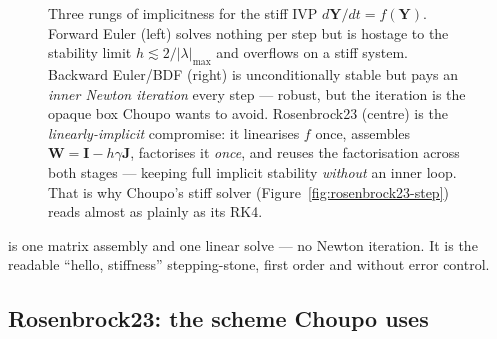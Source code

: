\documentclass[11pt,a4paper]{article}
\newcommand{\Jac}{\mathbf{J}}
\newcommand{\Yv}{\mathbf{Y}}                          %
\begin{document}
\begin{figure}[ht]
\caption{Three rungs of implicitness for the stiff IVP
$d\Yv/dt=f(\Yv)$.  Forward Euler (left) solves nothing per step but is
hostage to the stability limit $h\lesssim2/|\lambda|_{\max}$ and
overflows on a stiff system.  Backward Euler/BDF (right) is
unconditionally stable but pays an \emph{inner Newton iteration} every
step --- robust, but the iteration is the opaque box Choupo wants to
avoid.  Rosenbrock23 (centre) is the \emph{linearly-implicit}
compromise: it linearises $f$ once, assembles
$\mathbf W=\mathbf I-h\gamma\Jac$, factorises it \emph{once}, and reuses
the factorisation across both stages --- keeping full implicit stability
\emph{without} an inner loop.  That is why Choupo's stiff solver
(Figure~\ref{fig:rosenbrock23-step}) reads almost as plainly as its
RK4.}
\label{fig:implicit-ladder}
\end{figure}

is one matrix assembly and one linear solve --- no Newton iteration.
It is the readable ``hello, stiffness'' stepping-stone, first order
and without error control.

\subsection{Rosenbrock23: the scheme Choupo uses}
\end{document}
